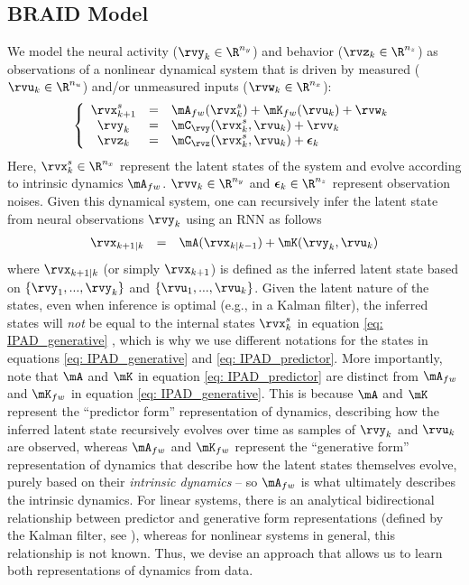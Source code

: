 \documentclass{article} %
\newcommand{\ourmethod}{BRAID}
\begin{document}
\subsection{\ourmethod{} Model}\label{sec: IPAD}
We model the neural activity (\(\rvy_{k} \in \R^{n_y}\)) and behavior (\(\rvz_{k} \in \R^{n_z}\)) as observations of a nonlinear dynamical system that is driven by measured (\(\rvu_{k} \in \R^{n_u}\)) and/or unmeasured inputs (\(\rvw_{k} \in \R^{n_x}\)):
\begin{equation}\label{eq: IPAD_generative}
    \left\{
    \begin{array}{ccl}
    \rvx^{s}_{k+1} &=& \mA_{fw}(\rvx^{s}_{k}) + \mK_{fw}(\rvu_{k}) + \rvw_{k}\\
    \rvy_{k} &=& \mC_{\rvy}(\rvx^{s}_{k}, \rvu_{k}) + \rvv_{k}\\
    \rvz_{k} &=& \mC_{\rvz}(\rvx^{s}_{k}, \rvu_{k}) + \beps_{k}\\
    \end{array}
    \right.
\end{equation}
Here, \(\rvx^{s}_{k} \in \R^{n_x}\) represent the latent states of the system and evolve according to intrinsic dynamics \(\mA_{fw}\). 
\(\rvv_{k}\in \R^{n_y}\) and \(\beps_{k}\in \R^{n_z}\) represent observation noises. 
Given this dynamical system, one can recursively infer the latent state from neural observations \(\rvy_{k}\) using an RNN as follows
\begin{equation}\label{eq: IPAD_predictor}
    \begin{array}{ccl}
    \rvx_{k+1|k} &=& \mA(\rvx_{k|k-1}) + \mK(\rvy_{k}, \rvu_{k})
    \end{array}
\end{equation}
where \(\rvx_{k+1|k}\) (or simply \(\rvx_{k+1}\)) is defined as the inferred latent state based on \(\{\rvy_{1}, ... , \rvy_{k}\}\) and \(\{\rvu_{1}, ... , \rvu_{k}\}\). Given the latent nature of the states, even when inference is optimal (e.g., in a Kalman filter), the inferred states will \textit{not} be equal to the internal states \(\rvx^{s}_{k}\) in equation \ref{eq: IPAD_generative} \citep{katayama2006subspace}, which is why we use different notations for the states in equations \ref{eq: IPAD_generative} and \ref{eq: IPAD_predictor}. More importantly, note that \(\mA\) and \(\mK\) in equation \ref{eq: IPAD_predictor} are distinct from \(\mA_{fw}\) and \(\mK_{fw}\) in equation \ref{eq: IPAD_generative}. This is because \(\mA\) and \(\mK\) represent the ``predictor form'' representation of dynamics, describing how the inferred latent state recursively evolves over time as samples of \(\rvy_{k}\) and \(\rvu_{k}\) are observed, whereas \(\mA_{fw}\) and \(\mK_{fw}\) represent the ``generative form''  representation of dynamics that describe how the latent states themselves evolve, purely based on their \textit{intrinsic dynamics} -- so \(\mA_{fw}\) is what ultimately describes the intrinsic dynamics. For linear systems, there is an analytical bidirectional relationship between predictor and generative form representations (defined by the Kalman filter, see \citealp{katayama2006subspace}), whereas for nonlinear systems in general, this relationship is not known. Thus, we devise an approach that allows us to learn both representations of dynamics from data.
\end{document}
